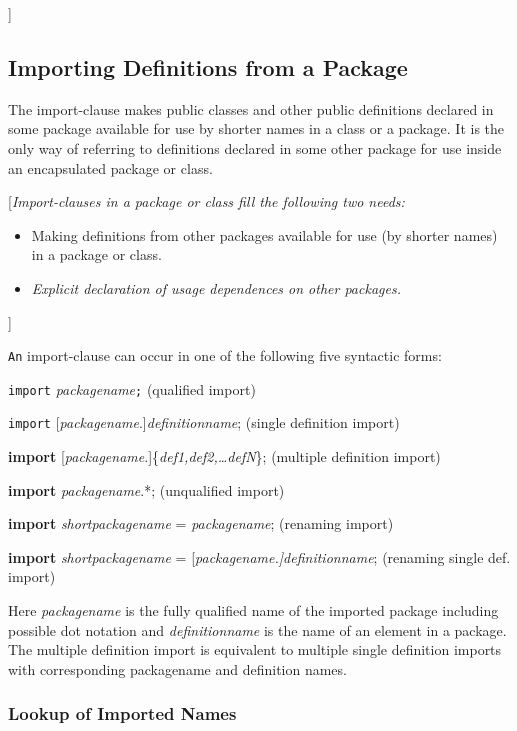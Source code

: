 {]}

\subsection{Importing Definitions from a Package}

The import-clause makes public classes and other public definitions
declared in some package available for use by shorter names in a class
or a package. It is the only way of referring to definitions declared in
some other package for use inside an encapsulated package or class.

{[}\emph{Import-clauses in a package or class fill the following two
needs:}

\begin{itemize}
\item
  Making definitions from other packages available for use (by shorter
  names) in a package or class.
\item
  \emph{Explicit declaration of usage dependences on other packages.}
\end{itemize}

{]}

\lstinline!An! import-clause can occur in one of the following five syntactic forms:

\lstinline!import! \emph{packagename}\lstinline!;! (qualified import)

\lstinline!import! {[}\emph{packagename}.{]}\emph{definitionname}; (single
definition import)

\textbf{import}
{[}\emph{packagename}.{]}\{\emph{def1,def2,\ldots{}defN}\}; (multiple
definition import)

\textbf{import} \emph{packagename}.*; (unqualified import)

\textbf{import} \emph{shortpackagename} = \emph{packagename}; (renaming
import)

\textbf{import} \emph{shortpackagename} =
{[}\emph{packagename.{]}definitionname}; (renaming single def. import)

Here \emph{packagename} is the fully qualified name of the imported
package including possible dot notation and \emph{definitionname} is the
name of an element in a package. The multiple definition import is
equivalent to multiple single definition imports with corresponding
packagename and definition names.

\subsubsection{Lookup of Imported Names}

